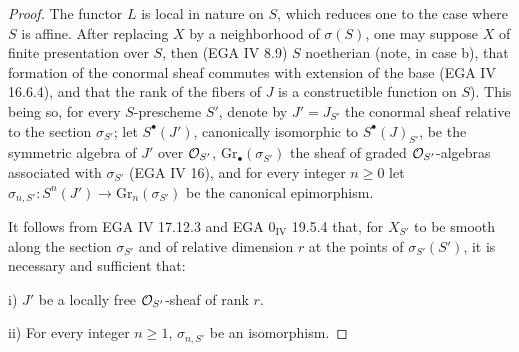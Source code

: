 \begin{proof}
The functor $L$ is local in nature on $S$, which reduces one to the case where $S$ is affine. After replacing $X$ by a neighborhood of $\sigma(S)$, one may suppose $X$ of finite presentation over $S$, then (EGA IV 8.9) $S$ noetherian (note, in case b), that formation of the conormal sheaf commutes with extension of the base (EGA IV 16.6.4), and that the rank of the fibers of $J$ is a constructible function on $S$). This being so, for every $S$-prescheme $S'$, denote by $J'=J_{S'}$ the conormal sheaf relative to the section $\sigma_{S'}$; let $S^\bullet(J')$, canonically isomorphic to $S^\bullet(J)_{S'}$, be the symmetric algebra of $J'$ over $\mathcal{O}_{S'}$, $\mathrm{Gr}_\bullet(\sigma_{S'})$ the sheaf of graded $\mathcal{O}_{S'}$-algebras associated with $\sigma_{S'}$ (EGA IV 16), and for every integer $n\geq0$ let $\sigma_{n,S'}:S^n(J')\to\mathrm{Gr}_n(\sigma_{S'})$ be the canonical epimorphism.

It follows from EGA IV 17.12.3 and EGA $0_{\mathrm{IV}}$ 19.5.4 that, for $X_{S'}$ to be smooth along the section $\sigma_{S'}$ and of relative dimension $r$ at the points of $\sigma_{S'}(S')$, it is necessary and sufficient that:

\noindent i) $J'$ be a locally free $\mathcal{O}_{S'}$-sheaf of rank $r$.

\noindent ii) For every integer $n\geq1$, $\sigma_{n,S'}$ be an isomorphism.


\end{proof}

